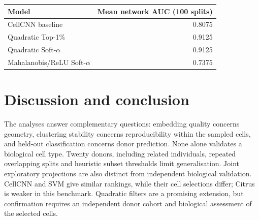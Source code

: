 \documentclass[11pt,a4paper]{article}
\begin{document}
\begin{center}\small
\begin{tabular}{@{}lr@{}}\toprule
Model & Mean network AUC (100 splits)\\\midrule
CellCNN baseline & 0.8075\\
Quadratic Top-1\% & 0.9125\\
Quadratic Soft-$\alpha$ & 0.9125\\
Mahalanobis/ReLU Soft-$\alpha$ & 0.7375\\\bottomrule
\end{tabular}
\end{center}

\section{Discussion and conclusion}
The analyses answer complementary questions: embedding quality concerns geometry, clustering stability concerns reproducibility within the sampled cells, and held-out classification concerns donor prediction. None alone validates a biological cell type. Twenty donors, including related individuals, repeated overlapping splits and heuristic subset thresholds limit generalisation. Joint exploratory projections are also distinct from independent biological validation. CellCNN and SVM give similar rankings, while their cell selections differ; Citrus is weaker in this benchmark. Quadratic filters are a promising extension, but confirmation requires an independent donor cohort and biological assessment of the selected cells.


\end{document}
